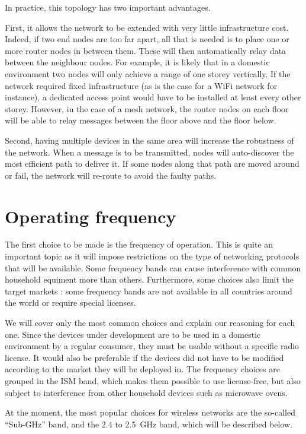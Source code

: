 In practice, this topology has two important advantages.

First, it allows the network to be extended with very little infrastructure
cost. Indeed, if two end nodes are too far apart, all that is needed is to place
one or more router nodes in between them. These will then automatically relay
data between the neighbour nodes. For example, it is likely that in a domestic
environment two nodes will only achieve a range of one storey vertically. If the
network required fixed infrastructure (as is the case for a WiFi network for
instance), a dedicated access point would have to be installed at least every
other storey. However, in the case of a mesh network, the router nodes on each
floor will be able to relay messages between the floor above and the floor
below.

Second, having multiple devices in the same area will increase the robustness of
the network. When a message is to be transmitted, nodes will auto-discover the
most efficient path to deliver it. If some nodes along that path are moved
around or fail, the network will re-route to avoid the faulty paths. 


\section{Operating frequency}\label{sec:frequency}

The first choice to be made is the frequency of operation. This is quite an
important topic as it will impose restrictions on the type of networking
protocols that will be available. Some frequency bands can cause interference
with common household equiment more than others. Furthermore, some choices also
limit the target markets : some frequency bands are not available in all
countries around the world or require special licenses.

We will cover only the most common choices and explain our reasoning for each
one. Since the devices under development are to be used in a domestic
environment by a regular consumer, they must be usable without a specific radio
license. It would also be preferable if the devices did not have to be modified
according to the market they will be deployed in. The frequency choices are
grouped in the \ac{ISM} band, which makes them possible to use license-free, but
also subject to interference from other household devices such as microwave
ovens.

At the moment, the most popular choices for wireless networks are the so-called
``Sub-GHz'' band, and the 2.4 to \SI{2.5}{GHz} band, which will be described
below.

